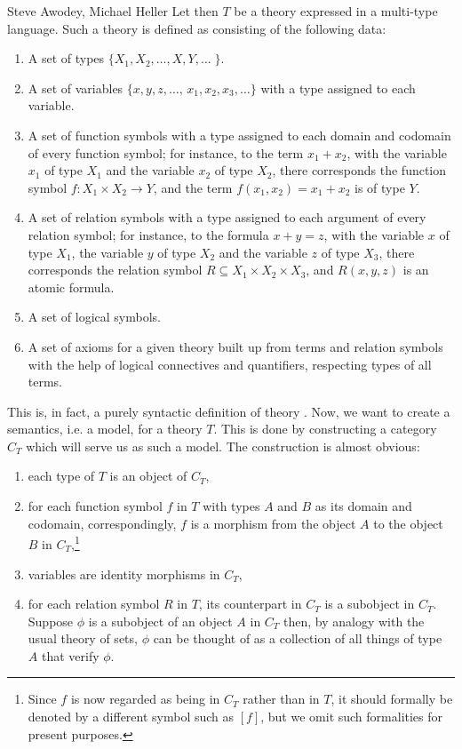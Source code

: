 \begin{artengenv2auth}{Steve Awodey, Michael Heller}
Let then $T$ be a theory expressed in a multi-type language.  Such a theory is defined as consisting of the following data:
\begin{enumerate}
\item
A set of types $\{X_1, X_2, \ldots, X, Y, \ldots\; \}$.
\item
A set of variables $\{x, y, z, \ldots ,\, x_1, x_2, x_3, \ldots \}$ with a type assigned to each variable.
\item
A set of function symbols with a type assigned to each domain and codomain of every function symbol; for instance, to the term $x_1+x_2$, with the variable $x_1$ of type $X_1$ and the variable $x_2$ of type $X_2$, there corresponds the function symbol $f: X_1 \times X_2 \to Y$, and the term $f(x_1,x_2) = x_1+x_2$ is of type $Y$.
\item
A set of relation symbols with a type assigned to each argument of every relation symbol; for instance, to the formula $x+y=z$, with the variable $x$ of type $X_1$, the variable $y$ of type $X_2$ and the variable $z$ of type $X_3$, there corresponds the relation symbol $R \subseteq X_1 \times X_2 \times X_3$, and $R(x,y,z)$ is an atomic formula.
\item
A set of logical symbols.
\item
A set of axioms for a given theory built up from terms and relation symbols with the help of logical connectives and quantifiers, respecting types of all terms.
\end{enumerate}
This is, in fact, a purely syntactic definition of theory \parencites[for details  see][pp.344--348]{Borc}[][pp.527--530]{MacLaneMoerdijk}. Now, we want to create a semantics, i.e. a model, for a theory $T$. This is done by constructing a category $C_T$ which will serve us as such a model. The construction is almost obvious:
\begin{enumerate}
\item
each type of $T$ is an object of $C_T$, 
\item
for each function symbol $f$ in $T$ with types $A$ and $B$ as its domain and codomain, correspondingly, $f$ is a morphism from the object $A$ to the object $B$ in $C_T$,\footnote{Since $f$ is now regarded as being in $C_T$ rather than in $T$, it should formally be denoted by a different symbol such as $[f]$, but we omit such formalities for present purposes.}
\item
variables are identity morphisms in $C_T$,
\item
for each relation symbol $R$ in $T$, its counterpart in $C_T$  is a subobject in $C_T$. Suppose $\phi $ is a subobject of an object $A$ in $C_T$ then, by analogy with the usual theory of sets, $\phi $ can be thought of as a collection of all things of type $A$ that verify $\phi $.

\end{enumerate}
\end{artengenv2auth}

